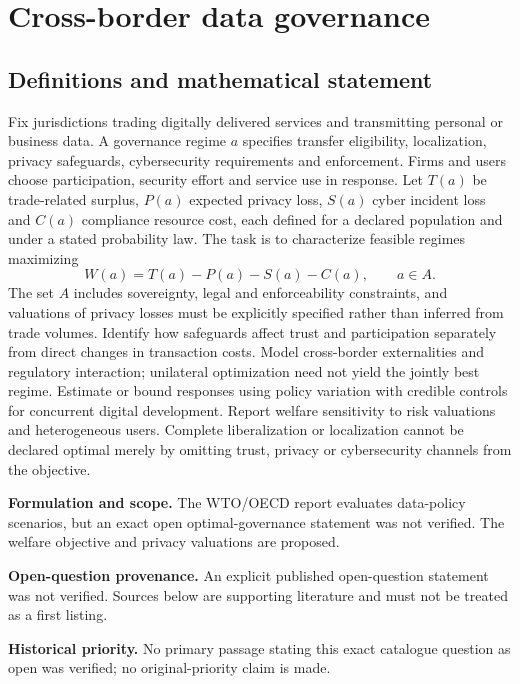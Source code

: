 \documentclass[11pt]{article}
\begin{document}
\section*{Cross-border data governance}\label{30007629}
\subsection{Definitions and mathematical statement}
Fix jurisdictions trading digitally delivered services and transmitting personal or business data. A governance regime \(a\) specifies transfer eligibility, localization, privacy safeguards, cybersecurity requirements and enforcement. Firms and users choose participation, security effort and service use in response. Let \(T(a)\) be trade-related surplus, \(P(a)\) expected privacy loss, \(S(a)\) cyber incident loss and \(C(a)\) compliance resource cost, each defined for a declared population and under a stated probability law. The task is to characterize feasible regimes maximizing
\[W(a)=T(a)-P(a)-S(a)-C(a),\qquad a\in A.\]
The set \(A\) includes sovereignty, legal and enforceability constraints, and valuations of privacy losses must be explicitly specified rather than inferred from trade volumes. Identify how safeguards affect trust and participation separately from direct changes in transaction costs. Model cross-border externalities and regulatory interaction; unilateral optimization need not yield the jointly best regime. Estimate or bound responses using policy variation with credible controls for concurrent digital development. Report welfare sensitivity to risk valuations and heterogeneous users. Complete liberalization or localization cannot be declared optimal merely by omitting trust, privacy or cybersecurity channels from the objective.

\par\textbf{Formulation and scope.} The WTO/OECD report evaluates data-policy scenarios, but an exact open optimal-governance statement was not verified. The welfare objective and privacy valuations are proposed.

\par\textbf{Open-question provenance.} An explicit published open-question statement was not verified. Sources below are supporting literature and must not be treated as a first listing.

\par\textbf{Historical priority.} No primary passage stating this exact catalogue question as open was verified; no original-priority claim is made.
\end{document}
